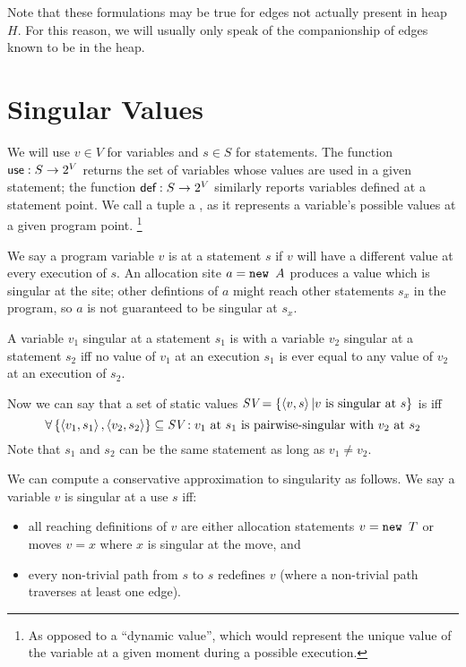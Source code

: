 \documentclass[11pt,notitlepage]{article}
\newcommand{\bigvar}[1]{\ensuremath{\text{\it #1}}}
\newcommand{\func}[1]{\ensuremath{\text{\sffamily #1}}}
\begin{document}
Note that these formulations may be true for edges not actually
present in heap $H$.  For this reason, we will usually only speak of the
companionship of edges known to be in the heap.

\section{Singular Values}
We will use $v\in V$ for variables and $s\in S$ for statements.  The
function $\func{use}:S\to 2^V$ returns the set of variables whose
values are used in a given statement; the function $\func{def}:S\to
2^V$ similarly reports variables defined at a statement point.
We call a tuple  a , as it represents
a variable's possible values at a given program point.%
\footnote{As opposed to a ``dynamic value'', which would represent the
  unique value of the variable at a given moment during a possible execution.}

We say a program variable $v$ is  at a statement $s$
if $v$ will have a different value at every execution of $s$.  An
allocation site $a = \text{\tt new }A$ produces a value which is singular
at the site; other defintions of $a$ might reach other statements
$s_x$ in the program, so $a$ is not guaranteed to be singular at $s_x$.

A variable $v_1$ singular at a statement $s_1$ is
 with a variable $v_2$ singular at a statement
$s_2$ iff no value of $v_1$ at an execution $s_1$ is ever equal to any
value of $v_2$ at an execution of $s_2$.

Now we can say that a set of static values
$\bigvar{SV}=\left\{ \tuple{v,s} | v \text{ is singular at } s \right\}$
is
 iff
\begin{displaymath}
\forall \left\{ \tuple{v_1,s_1}, \tuple{v_2,s_2} \right\} \subseteq
        \bigvar{SV} :
v_1 \text{ at } s_1 \text{ is pairwise-singular with } v_2 \text{ at } s_2
\end{displaymath}
Note that $s_1$ and $s_2$ can be the same statement as long as $v_1\neq v_2$.

We can compute a conservative approximation to singularity as follows.
We say a variable $v$ is singular at a use $s$ iff:
\begin{itemize}
\item all reaching definitions of $v$ are either allocation statements 
$v = \text{\tt new }T$ or moves $v = x$ where $x$ is singular at
the move, and
\item every non-trivial path from $s$ to $s$ redefines $v$ (where a
  non-trivial path traverses at least one edge).
\end{itemize}
\end{document}
